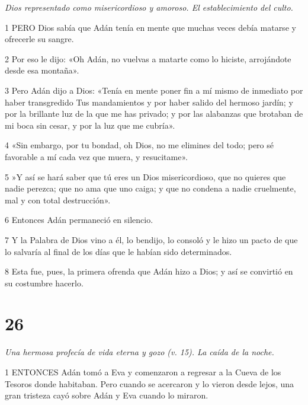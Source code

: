 \par \textit{Dios representado como misericordioso y amoroso. El establecimiento del culto.}

\par 1 PERO Dios sabía que Adán tenía en mente que muchas veces debía matarse y ofrecerle su sangre.

\par 2 Por eso le dijo: «Oh Adán, no vuelvas a matarte como lo hiciste, arrojándote desde esa montaña».

\par 3 Pero Adán dijo a Dios: «Tenía en mente poner fin a mí mismo de inmediato por haber transgredido Tus mandamientos y por haber salido del hermoso jardín; y por la brillante luz de la que me has privado; y por las alabanzas que brotaban de mi boca sin cesar, y por la luz que me cubría».

\par 4 «Sin embargo, por tu bondad, oh Dios, no me elimines del todo; pero sé favorable a mí cada vez que muera, y resucitame».

\par 5 »Y así se hará saber que tú eres un Dios misericordioso, que no quieres que nadie perezca; que no ama que uno caiga; y que no condena a nadie cruelmente, mal y con total destrucción».

\par 6 Entonces Adán permaneció en silencio.

\par 7 Y la Palabra de Dios vino a él, lo bendijo, lo consoló y le hizo un pacto de que lo salvaría al final de los días que le habían sido determinados.

\par 8 Esta fue, pues, la primera ofrenda que Adán hizo a Dios; y así se convirtió en su costumbre hacerlo.

\chapter{26}

\par \textit{Una hermosa profecía de vida eterna y gozo (v. 15). La caída de la noche.}

\par 1 ENTONCES Adán tomó a Eva y comenzaron a regresar a la Cueva de los Tesoros donde habitaban. Pero cuando se acercaron y lo vieron desde lejos, una gran tristeza cayó sobre Adán y Eva cuando lo miraron.

